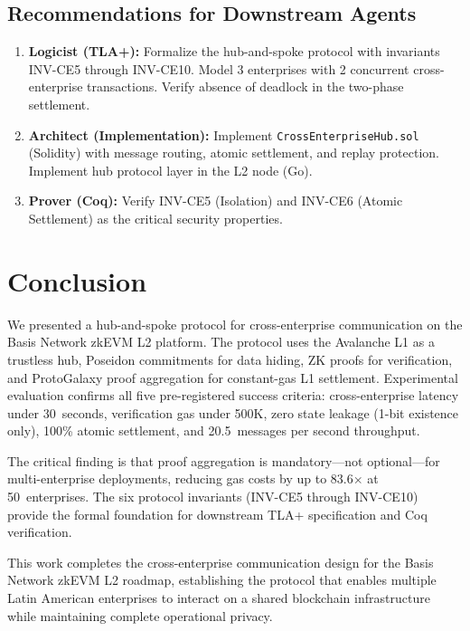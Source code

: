 \documentclass[conference]{IEEEtran}
\begin{document}
\subsection{Recommendations for Downstream Agents}

\begin{enumerate}
  \item \textbf{Logicist (TLA+):} Formalize the hub-and-spoke protocol with
        invariants INV-CE5 through INV-CE10. Model 3 enterprises with 2
        concurrent cross-enterprise transactions. Verify absence of deadlock
        in the two-phase settlement.
  \item \textbf{Architect (Implementation):} Implement
        \texttt{CrossEnterpriseHub.sol} (Solidity) with message routing,
        atomic settlement, and replay protection. Implement hub protocol layer
        in the L2 node (Go).
  \item \textbf{Prover (Coq):} Verify INV-CE5 (Isolation) and INV-CE6
        (Atomic Settlement) as the critical security properties.
\end{enumerate}


\section{Conclusion}
\label{sec:conclusion}

We presented a hub-and-spoke protocol for cross-enterprise communication on
the Basis Network zkEVM L2 platform. The protocol uses the Avalanche L1 as a
trustless hub, Poseidon commitments for data hiding, ZK proofs for
verification, and ProtoGalaxy proof aggregation for constant-gas L1
settlement. Experimental evaluation confirms all five pre-registered success
criteria: cross-enterprise latency under 30~seconds, verification gas under
500K, zero state leakage (1-bit existence only), 100\% atomic settlement, and
20.5~messages per second throughput.

The critical finding is that proof aggregation is mandatory---not
optional---for multi-enterprise deployments, reducing gas costs by up to
83.6$\times$ at 50~enterprises. The six protocol invariants (INV-CE5 through
INV-CE10) provide the formal foundation for downstream TLA+ specification
and Coq verification.

This work completes the cross-enterprise communication design for the Basis
Network zkEVM L2 roadmap, establishing the protocol that enables multiple
Latin American enterprises to interact on a shared blockchain infrastructure
while maintaining complete operational privacy.


\balance


\end{document}
